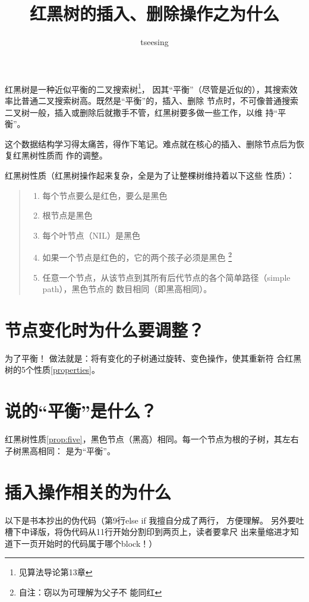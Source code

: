 \documentclass[a4paper, 11pt]{article}
\begin{document}
\title{红黑树的插入、删除操作之为什么}
\author{tseesing}
\maketitle
红黑树是一种近似平衡的二叉搜索树\footnote{见算法导论第13章}，
因其``平衡''（尽管是近似的），其搜索效率比普通二叉搜索树高。既然是``平衡''的，插入、删除
节点时，不可像普通搜索二叉树一般，插入或删除后就撒手不管，红黑树要多做一些工作，以维
持``平衡''。\par 
这个数据结构学习得太痛苦，得作下笔记。难点就在核心的插入、删除节点后为恢复红黑树性质而
作的调整。

红黑树性质\cite{algorithm:intro}（红黑树操作起来复杂，全是为了让整棵树维持着以下这些
性质）：\label{properties}
\begin{quote}
\begin{enumerate}
\item 每个节点要么是红色，要么是黑色\label{prop:one}
\item 根节点是黑色\label{prop:two}
\item 每个叶节点（NIL）是黑色\label{prop:three}
\item 如果一个节点是红色的，它的两个孩子必须是黑色\label{prop:four} \footnote{自注：窃以为可理解为父子不
能同红}
\item 任意一个节点，从该节点到其所有后代节点的各个简单路径（simple path），黑色节点的
数目相同（即黑高相同）。\label{prop:five}

\end{enumerate}
\end{quote}

\section{节点变化时为什么要调整？}
为了平衡！ 做法就是：将有变化的子树通过旋转、变色操作，使其重新符
合红黑树的5个性质\ref{properties}。

\section{说的``平衡''是什么？}
红黑树性质\ref{prop:five}，黑色节点（黑高）相同。每一个节点为根的子树，其左右子树黑高相同：
是为``平衡''。

\section{插入操作相关的为什么}

以下是书本\cite{algorithm:intro}抄出的伪代码（第9行else if 我擅自分成了两行， 方便理解。
另外要吐槽下中译版\cite{algorithm:intro}，将伪代码从11行开始分割印到两页上，读者要拿尺
出来量缩进才知道下一页开始时的代码属于哪个block！）
\end{document}
